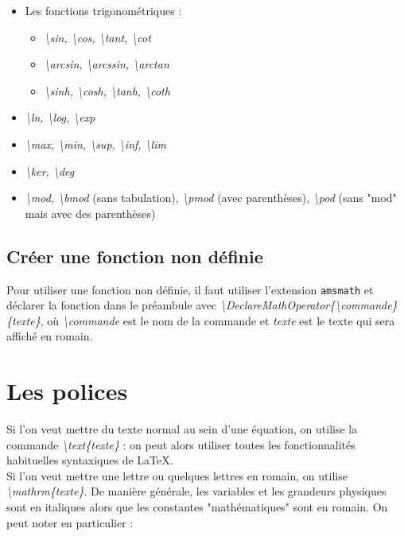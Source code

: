 \documentclass[a4paper, 10pt]{book}
\begin{document}
\begin{itemize}
\item Les fonctions trigonométriques : 
\begin{itemize}
\item \textit{\textbackslash sin, \textbackslash cos, \textbackslash tant, \textbackslash cot} 
\item \textit{\textbackslash arcsin, \textbackslash arcssin, \textbackslash arctan}
\item \textit{\textbackslash sinh, \textbackslash cosh, \textbackslash tanh, \textbackslash coth}
\end{itemize}
\item \textit{\textbackslash ln, \textbackslash log, \textbackslash exp}
\item \textit{\textbackslash max, \textbackslash min, \textbackslash sup, \textbackslash inf, \textbackslash lim}
\item \textit{\textbackslash ker, \textbackslash deg}
\item \textit{\textbackslash mod, \textbackslash bmod} (sans tabulation), \textit{\textbackslash pmod} (avec parenthèses), \textit{\textbackslash pod} (sans "mod" mais avec des parenthèses)
\end{itemize}

\subsection{Créer une fonction non définie}

Pour utiliser une fonction non définie, il faut utiliser l'extension \texttt{amsmath} et déclarer la fonction dans le préambule avec \textit{\textbackslash DeclareMathOperator\{\textbackslash commande\}\{texte\}}, où \textit{\textbackslash commande} est le nom de la commande et \textit{texte} est le texte qui sera affiché en romain.

\section{Les polices}

Si l'on veut mettre du texte normal au sein d'une équation, on utilise la commande \textit{\textbackslash text\{texte\}} : on peut alors utiliser toutes les fonctionnalités habituelles syntaxiques de \LaTeX. \\ 
Si l'on veut mettre une lettre ou quelques lettres en romain, on utilise \textit{\textbackslash mathrm\{texte\}}. De manière générale, les variables et les grandeurs physiques sont en italiques alors que les constantes "mathématiques" sont en romain. On peut noter en particulier : \\
\end{document}
